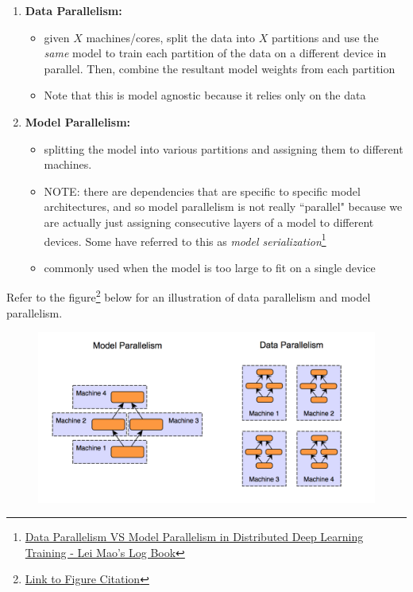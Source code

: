\documentclass{article}
\begin{document}
\begin{enumerate}
  \item \textbf{Data Parallelism:}
  \begin{itemize}
    \item given $X$ machines/cores, split the data into $X$ partitions and use the \textit{same} model to train each partition of the data on a different device in parallel. Then, combine the resultant model weights from each partition
    \item Note that this is model agnostic because it relies only on the data
  \end{itemize}
  \item \textbf{Model Parallelism:}
  \begin{itemize}
    \item splitting the model into various partitions and assigning them to different machines.
    \item NOTE: there are dependencies that are specific to specific model architectures, and so model parallelism is not really ``parallel" because we are actually just assigning consecutive layers of a model to different devices. Some have referred to this as \textit{model serialization}\footnote{\href{https://leimao.github.io/blog/Data-Parallelism-vs-Model-Paralelism/}{Data Parallelism VS Model Parallelism in Distributed Deep Learning Training - Lei Mao's Log Book}}
    \item commonly used when the model is too large to fit on a single device
  \end{itemize}
\end{enumerate}

Refer to the figure\footnote{\href{https://xiandong79.github.io/Intro-Distributed-Deep-Learning}{Link to Figure Citation}} below for an illustration of data parallelism and model parallelism.

\begin{figure}[h]
\includegraphics[scale = 0.45]{background}
\centering
\end{figure}
\end{document}
